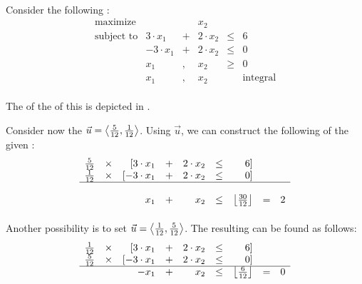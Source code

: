 \paragraph{}
\begin{example}
Consider the following :
\begin{equation}
\begin{array}{rrcrcr}
\mbox{maximize}&&&x_2\\
\mbox{subject to}&3\cdot x_1&+&2\cdot x_2&\leq&6\\
&-3\cdot x_1&+&2\cdot x_2&\leq&0\\
&x_1&,&x_2&\geq&0\\
&x_1&,&x_2&&\mbox{integral}
\end{array}
\end{equation}

\paragraph{}
The  of the  of this  is depicted in .



Consider now the  $\vec{u}=\left\langle \frac{5}{12},\frac{1}{12} \right\rangle$. Using $\vec{u}$, we can construct the following  of the given :
\begin{equation}
\begin{array}{rcrcrcrcr}
\tfrac{5}{12}&\times&[3\cdot x_1&+&2\cdot x_2&\leq&6]&&\\
\tfrac{1}{12}&\times&[-3\cdot x_1&+&2\cdot x_2&\leq&0]&&\\\hline\\
&&x_1&+&x_2&\leq&\left\lfloor \frac{30}{12} \right\rfloor&=&2
\end{array}
\end{equation}

\paragraph{}
Another possibility is to set $\vec{u}=\left\langle \frac{1}{12},\frac{5}{12} \right\rangle$. The resulting  can be found as follows:
\begin{equation}
\begin{array}{rcrcrcrcr}
\tfrac{1}{12}&\times&[3\cdot x_1&+&2\cdot x_2&\leq&6]&&\\
\tfrac{5}{12}&\times&[-3\cdot x_1&+&2\cdot x_2&\leq&0]&&\\\hline
&&-x_1&+&x_2&\leq&\left\lfloor \tfrac{6}{12} \right\rfloor&=&0
\end{array}
\end{equation}


\end{example}
